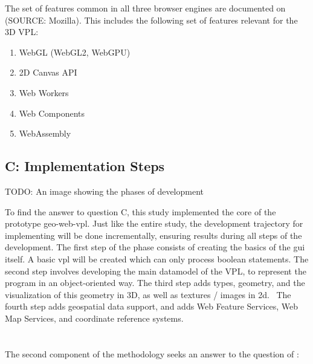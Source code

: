 The set of features common in all three browser engines are documented on (SOURCE: Mozilla). 
This includes the following set of features relevant for the 3D VPL:
\begin{enumerate}[-]
  \item WebGL (WebGL2, WebGPU)
  \item 2D Canvas API
  \item Web Workers
  \item Web Components
  \item WebAssembly
\end{enumerate}

\subsection*{C: Implementation Steps}

\begin{note}
TODO: An image showing the phases of development
\end{note}

To find the answer to question C, this study implemented the core of the prototype \ac{geo-web-vpl}.
Just like the entire study, the development trajectory for implementing will be done incrementally, ensuring results during all steps of the development. 
The first step of the phase consists of creating the basics of the \ac{gui} itself. 
A basic \ac{vpl} will be created which can only process boolean statements. 
The second step involves developing the main datamodel of the VPL, to represent the program in an object-oriented way. 
The third step adds types, geometry, and the visualization of this geometry in 3D, as well as textures / images in 2d. \
The fourth step adds geospatial data support, and adds Web Feature Services, Web Map Services, and coordinate reference systems.  


\section{\mySubRQTwoTitle} 
\label{sec:method-two}
The second component of the methodology seeks an answer to the question of \mySubRQTwoTitle: \mySubRQTwo


